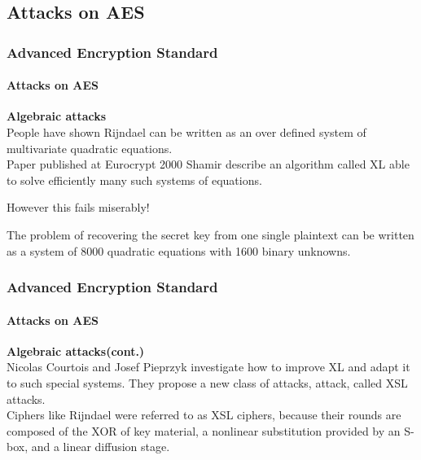 \subsection{Attacks on AES} 
\begin{frame}
	\frametitle{Advanced Encryption Standard}
		\framesubtitle{Attacks on AES}
		{\normalsize
		\textbf{Algebraic attacks}\\
		\vspace{0.4cm}
		{People have shown Rijndael can be written as an over defined system of multivariate quadratic equations.}\\ 
		{Paper published at Eurocrypt 2000 Shamir describe an algorithm called XL able to solve efficiently many such systems of 					equations.}\\
		\begin{alertblock}{}
		{However this fails miserably!}\\
		\end{alertblock}
		{The problem of recovering the secret key from one single plaintext can be written as a system of 8000 quadratic equations with 1600 binary unknowns.}\\
		}
\end{frame}

\begin{frame}
	\frametitle{Advanced Encryption Standard}
		\framesubtitle{Attacks on AES}
		\vspace{-2cm}
		{\normalsize
		\textbf{Algebraic attacks(cont.)}\\
		\vspace{0.4cm}
		{Nicolas Courtois and Josef Pieprzyk investigate how to improve XL and adapt it to such special systems. They propose a new class 		of attacks, attack, called XSL attacks.}\\ 
		\vspace{0.4cm}
		{Ciphers like Rijndael were referred to as XSL ciphers, because their rounds are composed of the XOR of key material, a nonlinear 		substitution provided by an S-box, and a linear diffusion stage.} 
		}
\end{frame}

